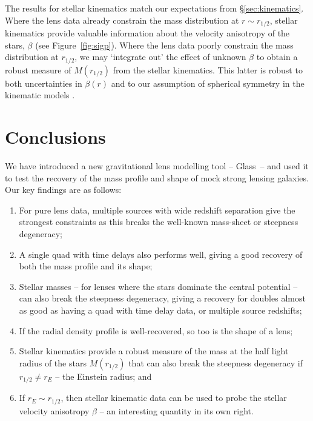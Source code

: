 \documentclass[galley,usenatbib]{mn2e}
\newcommand{\Mddd}{\ensuremath{M}}
\newcommand{\figref}[1] {Figure~\ref{#1}}
\newcommand{\secref}[1] {\S\ref{#1}}
\begin{document}
The results for stellar kinematics match our expectations from
\secref{sec:kinematics}. Where the lens data already constrain the mass
distribution at $r \sim r_{1/2}$, stellar kinematics provide valuable
information about the velocity anisotropy of the stars, $\beta$ (see
\figref{fig:sigp}). Where the lens data poorly constrain the mass distribution
at $r_{1/2}$, we may `integrate out' the effect of unknown $\beta$ to obtain a
robust measure of $\Mddd(r_{1/2})$ from the stellar kinematics. This latter is
robust to both uncertainties in $\beta(r)$ and to our assumption of spherical
symmetry in the kinematic models \citep{2012ApJ...754L..39A}.

\section{Conclusions}\label{sec:conclusions}

We have introduced a new gravitational lens modelling tool -- Glass\ -- and
used it to test the recovery of the mass profile and shape of mock strong
lensing galaxies. Our key findings are as follows: 

\begin{enumerate}
\item For pure lens data, multiple sources with wide redshift separation give
    the strongest constraints as this breaks the well-known mass-sheet or
    steepness degeneracy;

\item A single quad with time delays also performs well, giving a good recovery
    of both the mass profile and its shape; 

\item Stellar masses -- for lenses where the stars dominate the central
    potential -- can also break the steepness degeneracy, giving a recovery for
    doubles almost as good as having a quad with time delay data, or multiple
    source redshifts; 

\item If the radial density profile is well-recovered, so too is the shape of a lens; 

\item Stellar kinematics provide a robust measure of the mass at the half light
    radius of the stars $M(r_{1/2})$ that can also break the steepness
    degeneracy if $r_{1/2} \neq r_E$ -- the Einstein radius; and

\item If $r_E \sim r_{1/2}$, then stellar kinematic data can be used to probe
    the stellar velocity anisotropy $\beta$ -- an interesting quantity in its
    own right. 

\end{enumerate}
\end{document}
